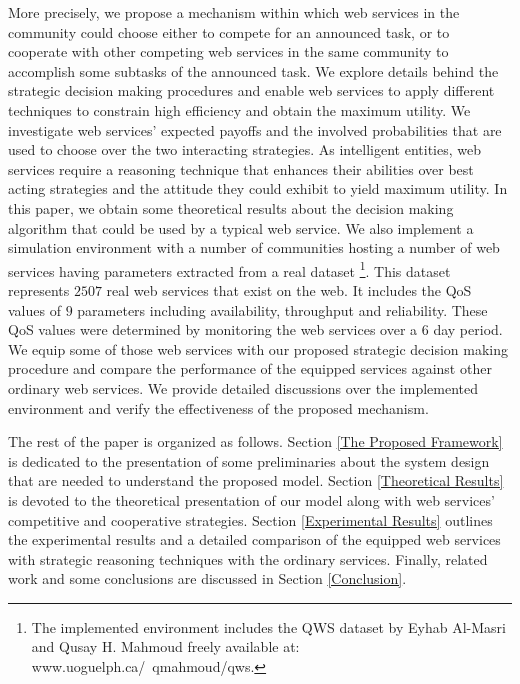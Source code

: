 \documentclass[fleqn]{singlecol-new}
\begin{document}
More precisely, we propose a mechanism within which web services
in the community could choose either to compete for an announced
task, or to cooperate with other competing web
services in the same community to accomplish some subtasks of the announced task. %
We explore details behind the strategic decision making procedures
and enable web services to apply different techniques to constrain
high efficiency and obtain the maximum utility. We investigate web
services' expected payoffs and the involved probabilities that are
used to choose over the two interacting
strategies. %
As intelligent entities, web services require a reasoning
technique that enhances their abilities over best acting
strategies and the attitude they could exhibit to yield maximum
utility. In this paper, we obtain some theoretical results about
the decision making algorithm that could be used by a typical web
service. We also implement a simulation environment with a number
of communities hosting a number of web services having parameters
extracted from a real dataset \cite{Almasri}\footnote{The
implemented environment includes the QWS dataset by Eyhab Al-Masri
and Qusay H. Mahmoud freely available at:
www.uoguelph.ca/~qmahmoud/qws.}. This dataset represents $2507$
real web services that exist on the web. It includes the QoS
values of $9$ parameters including availability, throughput and
reliability. These QoS values were determined by monitoring the
web services over a $6$ day period. We equip some of those web
services with our proposed strategic decision making procedure and
compare the performance of the equipped services against other
ordinary web services. We provide detailed discussions over the
implemented environment and verify the effectiveness of the
proposed mechanism.


The rest of the paper is organized as follows. Section \ref{The
Proposed Framework} is dedicated to the presentation of some
preliminaries about the system design that are needed to
understand the proposed model. Section \ref{Theoretical Results}
is devoted to the theoretical presentation of our model along with
web services' competitive and cooperative strategies. Section
\ref{Experimental Results} outlines the experimental results and a
detailed comparison of the equipped web services with strategic
reasoning techniques with the ordinary services. Finally, related
work and some conclusions are discussed in Section
\ref{Conclusion}.
\end{document}
